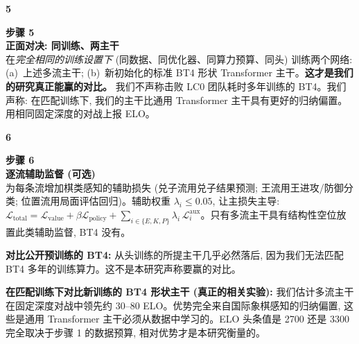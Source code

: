 \documentclass[10pt,a4paper]{article}
\begin{document}
\begin{minipage}{\linewidth}
\begin{minipage}[t]{0.06\linewidth}
\selectfont\LARGE\bfseries\color{forest}5
\end{minipage}\hfill
\begin{minipage}[t]{0.93\linewidth}
\textcolor{muted}{\scriptsize\sffamily\bfseries 步骤 5}\\[0pt]
\textcolor{deepforest}{\sffamily\normalsize\bfseries 正面对决: 同训练、两主干}\\[2pt]
在\emph{完全相同的训练设置下} (同数据、同优化器、同算力预算、同头) 训练两个网络: (a)~上述多流主干; (b)~新初始化的标准 BT4 形状 Transformer 主干。\textbf{这才是我们的研究真正能赢的对比。} 我们不声称击败 LC0 团队耗时多年训练的 BT4。我们声称: 在匹配训练下, 我们的主干比通用 Transformer 主干具有更好的归纳偏置。用相同固定深度的对战上报 ELO。
\end{minipage}
\end{minipage}\par
\vspace{2pt}{\color{linecolor}\rule{\linewidth}{0.3pt}}\vspace{2pt}\par
\begin{minipage}{\linewidth}
\begin{minipage}[t]{0.06\linewidth}
\selectfont\LARGE\bfseries\color{forest}6
\end{minipage}\hfill
\begin{minipage}[t]{0.93\linewidth}
\textcolor{muted}{\scriptsize\sffamily\bfseries 步骤 6}\\[0pt]
\textcolor{deepforest}{\sffamily\normalsize\bfseries 逐流辅助监督 (可选)}\\[2pt]
为每条流增加棋类感知的辅助损失 (兑子流用兑子结果预测; 王流用王进攻/防御分类; 位置流用局面评估回归)。辅助权重 $\lambda_i \leq 0.05$, 让主损失主导: $\mathcal{L}_{\text{total}} = \mathcal{L}_{\text{value}} + \beta\mathcal{L}_{\text{policy}} + \sum_{i\in\{E,K,P\}}\lambda_i\,\mathcal{L}_i^{\text{aux}}$。只有多流主干具有结构性空位放置此类辅助监督, BT4 没有。
\end{minipage}
\end{minipage}\par


\begin{tcolorbox}[goodcallout, title=现实预期 --- 准确率]
\textbf{对比公开预训练的 BT4:} 从头训练的所提主干几乎必然落后, 因为我们无法匹配 BT4 多年的训练算力。这不是本研究声称要赢的对比。

\textbf{在匹配训练下对比新训练的 BT4 形状主干 (真正的相关实验):} 我们估计多流主干在固定深度对战中领先约 $30$--$80$ ELO。优势完全来自国际象棋感知的归纳偏置, 这些是通用 Transformer 主干必须从数据中学习的。ELO 头条值是 2700 还是 3300 完全取决于步骤 1 的数据预算, 相对优势才是本研究衡量的。
\end{tcolorbox}
\end{document}
